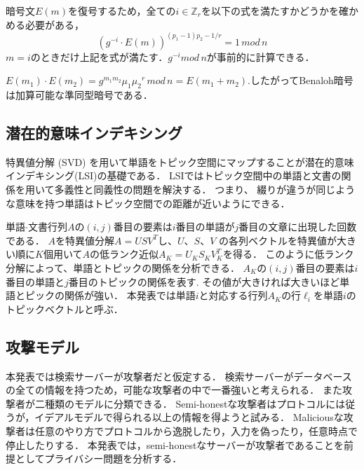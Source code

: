 \documentclass{jsarticle}
\theoremstyle{definition}
\begin{document}
暗号文$E(m)$を復号するため，全ての$i \in \mathbb{Z}_r$を以下の式を満たすかどうかを確かめる必要がある，
\begin{equation}
(g^{-i} \cdot E(m))^{(p_1-1){p_2-1}/r} = 1 \, mod \, n
\end{equation}
$m=i$のときだけ上記を式が満たす．$g^{-i} mod \, n $が事前的に計算できる．

$E(m_1)\cdot E(m_2) = g^{m_1m_2}{\mu_1\mu_2}^r \, mod \, n = E(m_1 + m_2)$.したがってBenaloh暗号は加算可能な準同型暗号である．

\subsection{潜在的意味インデキシング}\label{LSI}
特異値分解 (SVD) を用いて単語をトピック空間にマップすることが潜在的意味インデキシング(LSI)\cite{deerwester_indexing_1990}の基礎である．
LSIではトピック空間中の単語と文書の関係を用いて多義性と同義性の問題を解決する．
つまり、 綴りが違うが同じような意味を持つ単語はトピック空間での距離が近いようにできる．

単語$\cdot$文書行列$A$の$(i,j)$番目の要素は$i$番目の単語が$j$番目の文章に出現した回数である．
$A$を特異値分解$A = USV^T$し、$U$、$S$、$V$	の各列ベクトルを特異値が大きい順に$K$個用いて$A$の低ランク近似$A_K=U_KS_KV_{K}^T$を得る．
このように低ランク分解によって、単語とトピックの関係を分析できる．
$A_K$の$(i,j)$番目の要素は$i$番目の単語と$j$番目のトピックの関係を表す.
その値が大きければ大きいほど単語とピックの関係が強い．
本発表では単語$i$と対応する行列$A_K$の行$\ell_i$を単語$i$のトピックベクトルと呼ぶ．

\subsection{攻撃モデル}
本発表では検索サーバーが攻撃者だと仮定する．
検索サーバーがデータベースの全ての情報を持つため，可能な攻撃者の中で一番強いと考えられる．
また攻撃者が二種類のモデルに分類できる．
Semi-honestな攻撃者はプロトコルには従うが，イデアルモデルで得られる以上の情報を得ようと試みる．
Maliciousな攻撃者は任意のやり方でプロトコルから逸脱したり，入力を偽ったり，任意時点で停止したりする．
本発表では，semi-honestなサーバーが攻撃者であることを前提としてプライバシー問題を分析する．
\end{document}
